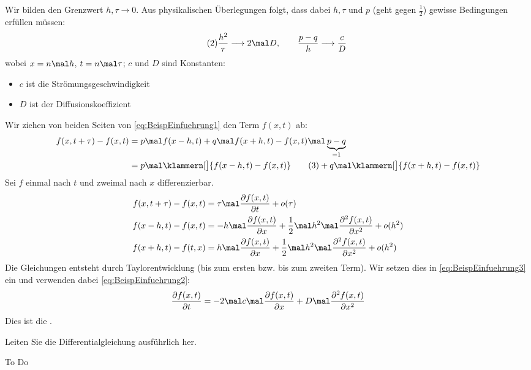 \begin{beisp}
	Wir bilden den Grenzwert $h,\tau\longrightarrow 0$.
	Aus physikalischen Überlegungen folgt, dass dabei $h,\tau$ und $p$ (geht gegen $\frac{1}{2}$) gewisse Bedingungen erfüllen müssen:
	\begin{align}\label{eq:BeispEinfuehrung2}\tag{2}
		\frac{h^2}{\tau}\longrightarrow 2\mal D,\qquad
		\frac{p-q}{h}\longrightarrow\frac{c}{D}
	\end{align}
	wobei $x=n\mal h$, $t=n\mal\tau$; $c$ und $D$ sind Konstanten:
	\begin{itemize}
		\item $c$ ist die Strömungsgeschwindigkeit
		\item $D$ ist der Diffusionskoeffizient
	\end{itemize}
	Wir ziehen von beiden Seiten von \eqref{eq:BeispEinfuehrung1} den Term $f(x,t)$ ab:
	\begin{align}
			f(x,t+\tau)-f(x,t)\nonumber
			&=p\mal f(x-h,t)+q\mal f(x+h,t)-f(x,t)\mal\underbrace{p-q}_{=1}\\
			&=p\mal\klammern[\big]{f(x-h,t)-f(x,t)}\label{eq:BeispEinfuehrung3}\tag{3}
			+q\mal\klammern[\big]{f(x+h,t)-f(x,t)}
	\end{align}
	Sei $f$ einmal nach $t$ und zweimal nach $x$ differenzierbar.
	\begin{align*}
		f(x,t+\tau)-f(x,t)
		&=\tau\mal\frac{\partial f(x,t)}{\partial t}+o(\tau)\\
		f(x-h,t)-f(x,t)
		&=-h\mal\frac{\partial f(x,t)}{\partial x}
		+\frac{1}{2}\mal h^2\mal\frac{\partial^2 f(x,t)}{\partial x^2}+o(h^2)\\
		f(x+h,t)-f(t,x)
		&=h\mal\frac{\partial f(x,t)}{\partial x}+\frac{1}{2}\mal h^2\mal\frac{\partial^2 f(x,t)}{\partial x^2}+o(h^2)
	\end{align*}
	Die Gleichungen entsteht durch Taylorentwicklung (bis zum ersten bzw. bis zum zweiten Term).
	Wir setzen dies in \eqref{eq:BeispEinfuehrung3} ein und verwenden dabei \eqref{eq:BeispEinfuehrung2}:
	\begin{align*}
		\frac{\partial f(x,t)}{\partial t}
		=-2\mal c\mal\frac{\partial f(x,t)}{\partial x}+D\mal\frac{\partial^2 f(x,t)}{\partial x^2}
	\end{align*}
	Dies ist die .
	\begin{aufgabe}[1.2 Teiil 2]
		Leiten Sie die Differentialgleichung ausführlich her.
	\end{aufgabe}
	\begin{lösung}
		To Do %
	\end{lösung}
\end{beisp}

